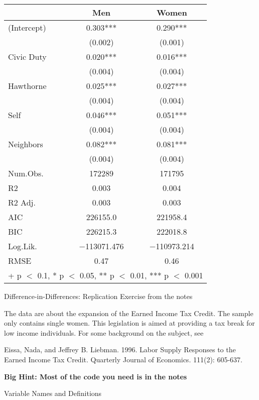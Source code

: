 \documentclass[
]{article}
\begin{document}
\begin{table}
\centering
\begin{tabular}[t]{lcc}
\toprule
  & Men & Women\\
\midrule
(Intercept) & \num{0.303}*** & \num{0.290}***\\
 & (\num{0.002}) & (\num{0.001})\\
Civic Duty & \num{0.020}*** & \num{0.016}***\\
 & (\num{0.004}) & \vphantom{3} (\num{0.004})\\
Hawthorne & \num{0.025}*** & \num{0.027}***\\
 & (\num{0.004}) & \vphantom{2} (\num{0.004})\\
Self & \num{0.046}*** & \num{0.051}***\\
 & (\num{0.004}) & \vphantom{1} (\num{0.004})\\
Neighbors & \num{0.082}*** & \num{0.081}***\\
 & (\num{0.004}) & (\num{0.004})\\
\midrule
Num.Obs. & \num{172289} & \num{171795}\\
R2 & \num{0.003} & \num{0.004}\\
R2 Adj. & \num{0.003} & \num{0.003}\\
AIC & \num{226155.0} & \num{221958.4}\\
BIC & \num{226215.3} & \num{222018.8}\\
Log.Lik. & \num{-113071.476} & \num{-110973.214}\\
RMSE & \num{0.47} & \num{0.46}\\
\bottomrule
\multicolumn{3}{l}{\rule{0pt}{1em}+ p $<$ 0.1, * p $<$ 0.05, ** p $<$ 0.01, *** p $<$ 0.001}\\
\end{tabular}
\end{table}

Difference-in-Differences: Replication Exercise from the notes

The data are about the expansion of the Earned Income Tax Credit. The
sample only contains single women. This legislation is aimed at
providing a tax break for low income individuals. For some background on
the subject, see

Eissa, Nada, and Jeffrey B. Liebman. 1996. Labor Supply Responses to the
Earned Income Tax Credit. Quarterly Journal of Economics. 111(2):
605-637.

\textbf{Big Hint: Most of the code you need is in the notes}

Variable Names and Definitions
\end{document}
